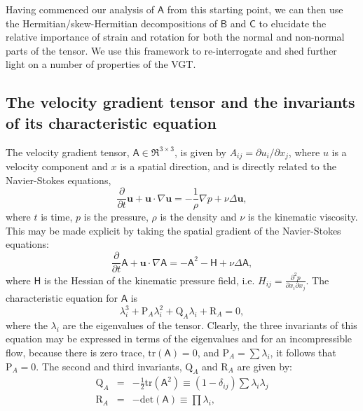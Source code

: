 \documentclass[preprint,amssymb,amsmath,aip,cha]{revtex4-1}
\begin{document}
Having commenced our analysis of $\mathsf{A}$ from this starting point, we can then use the Hermitian/skew-Hermitian decompositions of $\mathsf{B}$ and $\mathsf{C}$ to elucidate the relative importance of strain and rotation for both the normal and non-normal parts of the tensor. We use this framework to re-interrogate and shed further light on a number of properties of the VGT. 

\subsection{The velocity gradient tensor and the invariants of its characteristic equation} 
\label{sect.VGTinv}
The velocity gradient tensor, $\mathsf{A} \in \Re^{3 \times 3}$, is given by $A_{ij} = \partial u_{i}/\partial x_{j}$, where $u$ is a velocity component and $x$ is a spatial direction, and is directly related to the Navier-Stokes equations, 
\begin{equation}
\frac{\partial}{\partial t}\mathbf{u} + \mathbf{u} \cdot \nabla \mathbf{u} = -\frac{1}{\rho}\nabla p + \nu \Delta \mathbf{u},
\label{eq.NS}
\end{equation}
where $t$ is time, $p$ is the pressure, $\rho$ is the density and $\nu$ is the kinematic viscosity. This may be made explicit by taking the spatial gradient of the Navier-Stokes equations:
\begin{equation}
\frac{\partial}{\partial t}\mathsf{A} + \mathbf{u} \cdot \nabla \mathsf{A} = -\mathsf{A}^{2} - \mathsf{H} + \nu \Delta \mathsf{A},
\label{eq.VGT}
\end{equation}
where $\mathsf{H}$ is the Hessian of the kinematic pressure field, i.e. $H_{ij} = \frac{\partial^{2} p}{\partial x_{i} \partial x_{j}}$. The characteristic equation for $\mathsf{A}$ is
\begin{equation}
\lambda_{i} ^{3} + \mbox{P}_{A} \lambda_{i}^{2} + \mbox{Q}_{A} \lambda_{i} + \mbox{R}_{A} = 0,
\label{eq.lambdaPQR}
\end{equation}
where the $\lambda_{i}$ are the eigenvalues of the tensor. Clearly, the three invariants of this equation may be expressed in terms of the eigenvalues and for an incompressible flow, because there is zero trace, $\text{tr}(\mathsf{A})=0$, and $\mbox{P}_{A} = \sum \lambda_{i}$, it follows that $\mbox{P}_{A} = 0$. The second and third invariants, $\mbox{Q}_{A}$ and $\mbox{R}_{A}$ are given by:
\begin{eqnarray}
\label{eq.Q}
\mbox{Q}_{A} &=& -\frac{1}{2}\text{tr}(\mathsf{A}^{2}) \equiv (1 - \delta_{ij})\sum \lambda_{i}\lambda_{j}\\
\mbox{R}_{A} &=&  -\mbox{det}(\mathsf{A}) \equiv \prod \lambda_{i},
\label{eq.R}
\end{eqnarray} 
\end{document}
